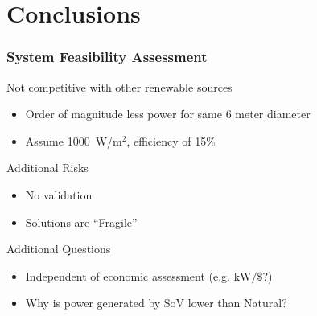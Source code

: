 \documentclass[mathserif]{beamer}
\begin{document}
%
%
\section{Conclusions}
\begin{frame}
 \frametitle{System Feasibility Assessment}

 \begin{block}{Not competitive with other renewable sources}
 \begin{itemize}
 \item Order of magnitude less power for same 6 meter diameter
 \item Assume 1000~W/$\text{m}^2$, efficiency of 15\%
 \end{itemize}
 \end{block}


 \begin{block}{Additional Risks}
 \begin{itemize}
 \item No validation
 \item Solutions are ``Fragile''
 \end{itemize}
 \end{block}

 \begin{block}{Additional Questions}
 \begin{itemize}
 \item Independent of economic assessment (e.g. $\text{kW}/\$$?)
 \item Why is power generated by SoV lower than Natural?
 \end{itemize}
 \end{block}


\end{frame}
\end{document}
